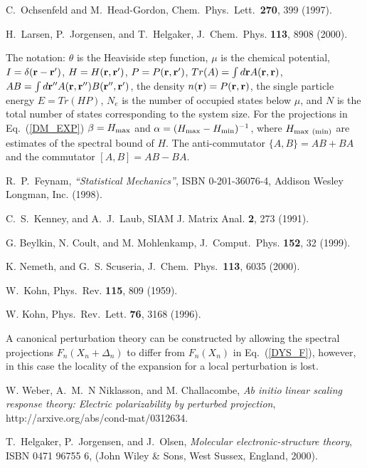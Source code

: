 \documentclass[prl,aps,twocolumn,showpacs,twocolumngrid,superbib]{revtex4}
\begin{document}
\begin{references}
 C.\ Ochsenfeld and M.\ Head-Gordon,
Chem.\ Phys.\ Lett.\ {\bf 270}, 399 (1997).

 H.\ Larsen, P.\ Jorgensen, and T.\ Helgaker,
J.\ Chem.\ Phys. {\bf 113}, 8908 (2000).

 The notation: $\theta$ is the Heaviside step function,
$\mu$ is the chemical potential, 
$I = \delta({\bf r-r'})$, $H = H({\bf r,r'})$, $P = P({\bf r,r'})$,
$Tr(A) = \int d{\bf r} A({\bf r,r})$, $AB = \int d{\bf r''} A({\bf r,r''})B(\bf r'',r')$,
the density $n({\bf r}) = P({\bf r,r})$, the single particle energy $E = Tr(HP)$,
$N_e$ is the number of occupied states below $\mu$, and 
$N$ is the total number of states corresponding to the system size.
For the projections in Eq.\ (\ref{DM_EXP}) $\beta = H_{\rm max}$ and
$\alpha = (H_{\rm max} - H_{\rm min})^{-1}$, where $H_{\rm max~(min)}$
are estimates of the spectral bound of $H$.  The anti-commutator 
$\{A,B\} = AB+BA$ and the commutator $[A,B] = AB-BA$.

 R.\ P.\ Feynam, {\em ``Statistical Mechanics''},
ISBN 0-201-36076-4, Addison Wesley Longman, Inc. (1998).

 C.\ S.\ Kenney, and A.\ J.\ Laub,
SIAM J. Matrix Anal. {\bf 2}, 273 (1991).

 G. Beylkin, N. Coult, and M. Mohlenkamp,
J.\ Comput.\ Phys. {\bf 152}, 32 (1999).

 K. Nemeth, and G.\ S. Scuseria,
J.\ Chem.\ Phys.\ {\bf 113}, 6035 (2000).

 W.\ Kohn,
Phys.\ Rev. {\bf 115}, 809 (1959).


 W. Kohn, Phys.\ Rev.\ Lett. {\bf 76}, 3168 (1996).

 A canonical perturbation theory can be constructed
by allowing the spectral projections $F_n(X_n+\Delta_n)$ to differ
from $F_n(X_n)$ in Eq.\ (\ref{DYS_F}), however, in this case the
locality of the expansion for a local perturbation is lost.

 W. Weber, A.\ M.\ N Niklasson, and M. Challacombe,
{\it Ab initio linear scaling response theory: Electric polarizability 
by perturbed projection}, http://arxive.org/abs/cond-mat/0312634.

 T.\ Helgaker, P.\ Jorgensen, and J.\ Olsen, 
{\em Molecular electronic-structure theory}, ISBN 0471 96755 6, 
(John Wiley \& Sons, West Sussex, England, 2000).


\end{references}
\end{document}
